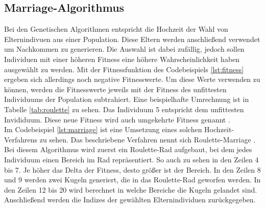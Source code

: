 \subsection{Marriage-Algorithmus}
Bei den Genetischen Algorithmen entspricht die Hochzeit der Wahl von Elternindivuen aus einer Population. Diese Eltern werden anschließend verwendet um Nachkommen zu generieren. 
Die Auswahl ist dabei zufällig, jedoch sollen Individuen mit einer höheren Fitness eine höhere Wahrscheinlichkeit haben ausgewählt zu werden. 
Mit der Fitnessfunktion des Codebeispiels \ref{lst:fitness} ergeben sich allerdings noch negative Fitnesswerte. Um diese Werte verwenden zu können, werden die Fitnesswerte jeweils mit der Fitness des unfittesten Individuums der Population subtrahiert. Eine beispielhafte Umrechnung ist in Tabelle \ref{tab:roulette} zu sehen. Das Individuum 5 entspricht dem unfittesten Invididuum. Diese neue Fitness wird auch umgekehrte Fitness genannt \cite[S. 400]{schoeneburg}.\\
Im Codebeispiel \ref{lst:marriage} ist eine Umsetzung eines solchen Hochzeit-Verfahrens zu sehen. Das beschriebene Verfahren nennt sich Roulette-Marriage \cite[S. 204]{schoeneburg}. Bei diesem Algorithmus wird zuerst ein Roulette-Rad aufgebaut, bei dem jedes Individuum einen Bereich im Rad repräsentiert.
So auch zu sehen in den Zeilen 4 bis 7. Je höher das Delta der Fitness, desto größer ist der Bereich. In den Zeilen 8 und 9 werden zwei Kugeln generiert, die in das Roulette-Rad geworfen werden. In den Zeilen 12 bis 20 wird berechnet in welche Bereiche die Kugeln gelandet sind. Anschließend werden die Indizes der 
gewählten Elternindividuen zurückgegeben.

